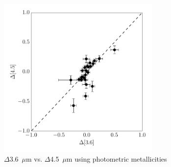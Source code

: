 \documentclass[a4paper,fleqn,usenatbib]{mnras}
\begin{document}
\begin{figure}
\begin{center}
\includegraphics[width=80mm]{final_plots/deltadelta_3p6_4p5_phot.pdf}
\caption{$\Delta$3.6~$\mu$m vs. $\Delta$4.5~$\mu$m using photometric metallicities}
\label{fig:deltadelta_phot}
\end{center}
\end{figure}





\bsp	%
\label{lastpage}
\end{document}
